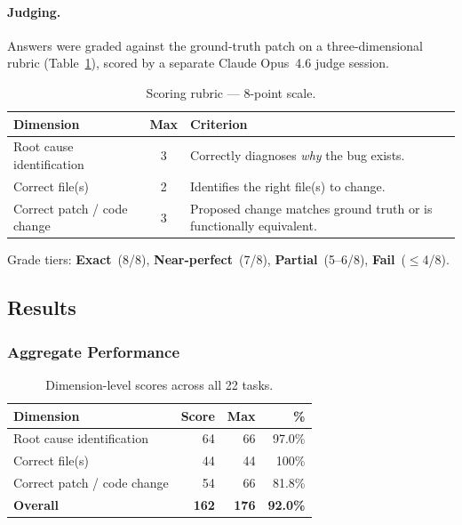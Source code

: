 \paragraph{Judging.}
Answers were graded against the ground-truth patch on a
three-dimensional rubric (Table~\ref{tab:rubric-raw}), scored by a
separate Claude Opus~4.6 judge session.

\begin{table}[h]
\centering
\caption{Scoring rubric — 8-point scale.}\label{tab:rubric-raw}
\begin{tabular}{lcp{8cm}}
\toprule
\textbf{Dimension} & \textbf{Max} & \textbf{Criterion} \\
\midrule
Root cause identification & 3 & Correctly diagnoses \emph{why} the bug exists. \\
Correct file(s)           & 2 & Identifies the right file(s) to change. \\
Correct patch / code change & 3 & Proposed change matches ground truth or is functionally equivalent. \\
\bottomrule
\end{tabular}
\end{table}

\noindent
Grade tiers: \textbf{Exact}~(8/8), \textbf{Near-perfect}~(7/8),
\textbf{Partial}~(5--6/8), \textbf{Fail}~($\le$4/8).

\subsection{Results}

\subsubsection{Aggregate Performance}

\begin{table}[h]
\centering
\caption{Dimension-level scores across all 22 tasks.}\label{tab:dim-raw}
\begin{tabular}{lrrr}
\toprule
\textbf{Dimension} & \textbf{Score} & \textbf{Max} & \textbf{\%} \\
\midrule
Root cause identification   & 64 & 66 & 97.0\% \\
Correct file(s)             & 44 & 44 & 100\%  \\
Correct patch / code change & 54 & 66 & 81.8\% \\
\midrule
\textbf{Overall}            & \textbf{162} & \textbf{176} & \textbf{92.0\%} \\
\bottomrule
\end{tabular}
\end{table}

